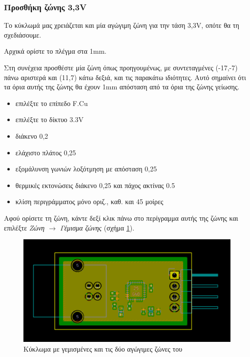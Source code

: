 \documentclass[a4paper]{article}
\begin{document}
\subsubsection{Προσθήκη ζώνης 3,3V}

Το κύκλωμά μας χρειάζεται και μία αγώγιμη ζώνη για την τάση 3,3V, οπότε θα τη σχεδιάσουμε.

Αρχικά ορίστε το πλέγμα στα 1mm.

Στη συνέχεια προσθέστε μία ζώνη όπως προηγουμένως, με συντεταγμένες (-17,-7) πάνω αριστερά και (11,7) κάτω δεξιά, και τις παρακάτω ιδιότητες. Αυτό σημαίνει ότι τα όρια αυτής της ζώνης θα έχουν 1mm απόσταση από τα όρια της ζώνης γείωσης.

\begin{itemize}
    \item επιλέξτε το επίπεδο F.Cu
    \item επιλέξτε το δίκτυο 3.3V
    \item διάκενο 0,2
    \item ελάχιστο πλάτος 0,25
    \item εξομάλυνση γωνιών λοξότμηση με απόσταση 0,25
    \item θερμικές εκτονώσεις διάκενο 0,25 και πάχος ακτίνας 0.5
    \item κλίση περιγράμματος μόνο οριζ., καθ. και 45 μοίρες
\end{itemize}

Αφού ορίσετε τη ζώνη, κάντε δεξί κλικ πάνω στο περίγραμμα αυτής της ζώνης και επιλέξτε \textit{Ζώνη $\rightarrow$ Γέμισμα ζώνης} (σχήμα \ref{fig:pcb-circ-twozones}).

\begin{figure}
  \begin{center}
    \includegraphics[width=.9\textwidth]{img/pcb-circ-twozones.png}
    \caption{Κύκλωμα με γεμισμένες και τις δύο αγώγιμες ζώνες του}
    \label{fig:pcb-circ-twozones}
  \end{center}
\end{figure}
\end{document}

